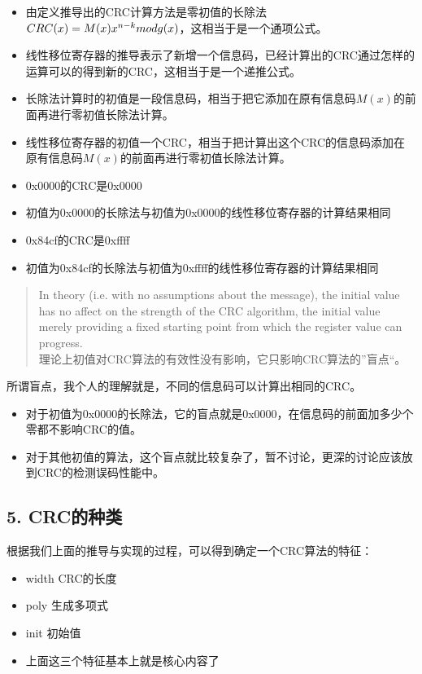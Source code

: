 \documentclass[
]{article}
\begin{document}
\begin{itemize}
\item
  由定义推导出的CRC计算方法是零初值的长除法$CRC(x)=M(x)x^{n-k} \space mod \space g(x)$，这相当于是一个通项公式。
\item
  线性移位寄存器的推导表示了新增一个信息码，已经计算出的CRC通过怎样的运算可以的得到新的CRC，这相当于是一个递推公式。
\item
  长除法计算时的初值是一段信息码，相当于把它添加在原有信息码$M(x)$的前面再进行零初值长除法计算。
\item
  线性移位寄存器的初值一个CRC，相当于把计算出这个CRC的信息码添加在原有信息码$M(x)$的前面再进行零初值长除法计算。
\item
  0x0000的CRC是0x0000
\item
  初值为0x0000的长除法与初值为0x0000的线性移位寄存器的计算结果相同
\item
  0x84cf的CRC是0xffff
\item
  初值为0x84cf的长除法与初值为0xffff的线性移位寄存器的计算结果相同
\end{itemize}

\begin{quote}
In theory (i.e. with no assumptions about the message), the initial
value has no affect on the strength of the CRC algorithm, the initial
value merely providing a fixed starting point from which the register
value can progress. \\
理论上初值对CRC算法的有效性没有影响，它只影响CRC算法的''盲点``。
\end{quote}

所谓盲点，我个人的理解就是，不同的信息码可以计算出相同的CRC。

\begin{itemize}
\item
  对于初值为0x0000的长除法，它的盲点就是0x0000，在信息码的前面加多少个零都不影响CRC的值。
\item
  对于其他初值的算法，这个盲点就比较复杂了，暂不讨论，更深的讨论应该放到CRC的检测误码性能中。
\end{itemize}

\hypertarget{header-n273}{%
\subsection{5. CRC的种类}\label{header-n273}}

根据我们上面的推导与实现的过程，可以得到确定一个CRC算法的特征：

\begin{itemize}
\item
  width CRC的长度
\item
  poly 生成多项式
\item
  init 初始值
\item
  上面这三个特征基本上就是核心内容了
\end{itemize}
\end{document}
